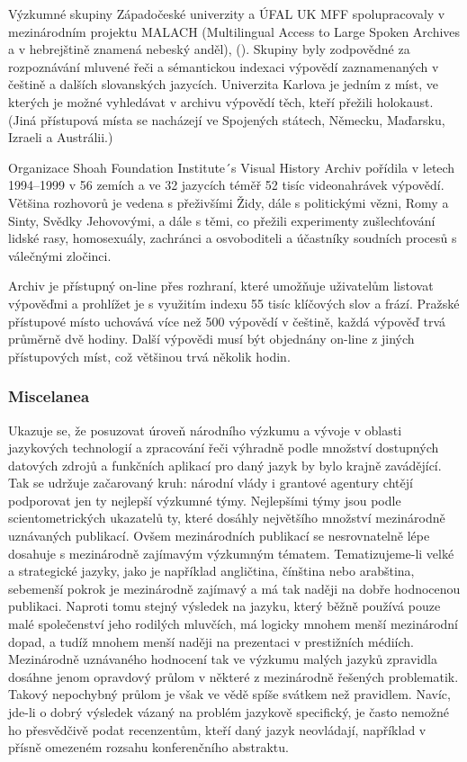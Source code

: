 \begin{multicols}{2}
Výzkumné skupiny Západočeské univerzity a ÚFAL UK MFF spolupracovaly v mezinárodním projektu MALACH (Multilingual Access to Large Spoken Archives a v hebrejštině znamená nebeský anděl), (\cite{Psutka2005}). Skupiny byly zodpovědné za rozpoznávání mluvené řeči a sémantickou indexaci výpovědí zaznamenaných v češtině a dalších slovanských jazycích. Univerzita Karlova je jedním z míst, ve kterých je možné vyhledávat v archivu výpovědí těch, kteří přežili holokaust. (Jiná přístupová místa se nacházejí ve Spojených státech, Německu, Maďarsku, Izraeli a Austrálii.)

Organizace Shoah Foundation Institute´s Visual History Archiv pořídila v letech 1994--1999 v 56 zemích a ve 32 jazycích téměř 52 tisíc videonahrávek výpovědí. Většina rozhovorů je vedena s přeživšími Židy, dále s politickými vězni, Romy a Sinty, Svědky Jehovovými, a dále s těmi, co přežili experimenty zušlechťování lidské rasy, homosexuály, zachránci a osvoboditeli a účastníky soudních procesů s válečnými zločinci.

Archiv je přístupný on-line přes rozhraní, které umožňuje uživatelům listovat výpověďmi a prohlížet je s využitím indexu 55 tisíc klíčových slov a  frází. Pražské přístupové místo uchovává více než 500 výpovědí v češtině, každá výpověď trvá průměrně dvě hodiny. Další výpovědi musí být objednány on-line z jiných přístupových míst, což většinou trvá několik hodin.

\subsubsection{Miscelanea}

Ukazuje se, že posuzovat úroveň národního výzkumu a vývoje v oblasti jazykových technologií a zpracování řeči výhradně podle množství dostupných datových zdrojů a funkčních aplikací pro daný jazyk by bylo krajně zavádějící. Tak se udržuje začarovaný kruh: národní vlády i grantové agentury chtějí podporovat jen ty nejlepší výzkumné týmy. Nejlepšími týmy jsou podle scientometrických ukazatelů ty, které dosáhly největšího množství mezinárodně uznávaných publikací. Ovšem mezinárodních publikací se nesrovnatelně lépe dosahuje s mezinárodně zajímavým výzkumným tématem. Tematizujeme-li velké a strategické jazyky, jako je například angličtina, čínština nebo arabština, sebemenší pokrok je mezinárodně zajímavý a má tak naději na dobře hodnocenou publikaci. Naproti tomu stejný výsledek na jazyku, který běžně používá pouze malé společenství jeho rodilých mluvčích, má logicky mnohem menší mezinárodní dopad, a tudíž mnohem menší naději na prezentaci v prestižních médiích. Mezinárodně uznávaného hodnocení tak ve výzkumu malých jazyků zpravidla dosáhne jenom opravdový průlom v některé z mezinárodně řešených problematik. Takový nepochybný průlom je však ve vědě spíše svátkem než pravidlem. Navíc, jde-li o dobrý výsledek vázaný na problém jazykově specifický, je často nemožné ho přesvědčivě podat recenzentům, kteří daný jazyk neovládají, například v přísně omezeném rozsahu konferenčního abstraktu.


\end{multicols}
